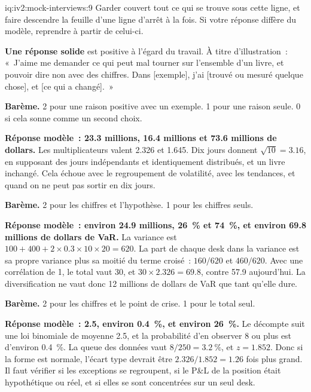 \begin{solution}{iq:iv2:mock-interviews:9}
Garder couvert tout ce qui se trouve sous cette ligne, et faire descendre la feuille d'une ligne d'arrêt à la fois. Si votre réponse diffère du modèle, reprendre à partir de celui-ci.

\ivstop
\textbf{Une réponse solide} est positive à l'égard du travail. À titre d'illustration~: «~J'aime me demander ce qui peut mal tourner sur l'ensemble d'un livre, et pouvoir dire non avec des chiffres. Dans [exemple], j'ai [trouvé ou mesuré quelque chose], et [ce qui a changé].~»

\textbf{Barème.} 2 pour une raison positive avec un exemple. 1 pour une raison seule. 0 si cela sonne comme un second choix.

\ivstop
\textbf{Réponse modèle~: 23.3 millions, 16.4 millions et 73.6 millions de dollars.} Les multiplicateurs valent 2.326 et 1.645. Dix jours donnent $\sqrt{10} = 3.16$, en supposant des jours indépendants et identiquement distribués, et un livre inchangé. Cela échoue avec le regroupement de volatilité, avec les tendances, et quand on ne peut pas sortir en dix jours.

\textbf{Barème.} 2 pour les chiffres et l'hypothèse. 1 pour les chiffres seuls.

\ivstop
\textbf{Réponse modèle~: environ 24.9 millions, 26~\% et 74~\%, et environ 69.8 millions de dollars de VaR.} La variance est $100 + 400 + 2 \times 0.3 \times 10 \times 20 = 620$. La part de chaque desk dans la variance est sa propre variance plus sa moitié du terme croisé~: $160/620$ et $460/620$. Avec une corrélation de 1, le total vaut 30, et $30 \times 2.326 = 69.8$, contre 57.9 aujourd'hui. La diversification ne vaut donc 12 millions de dollars de VaR que tant qu'elle dure.

\textbf{Barème.} 2 pour les chiffres et le point de crise. 1 pour le total seul.

\ivstop
\textbf{Réponse modèle~: 2.5, environ 0.4~\%, et environ 26~\%.} Le décompte suit une loi binomiale de moyenne 2.5, et la probabilité d'en observer 8 ou plus est d'environ 0.4~\%. La queue des données vaut $8/250 = 3.2~\%$, et $z = 1.852$. Donc si la forme est normale, l'écart type devrait être $2.326/1.852 = 1.26$ fois plus grand. Il faut vérifier si les exceptions se regroupent, si le P\&L de la position était hypothétique ou réel, et si elles se sont concentrées sur un seul desk.


\end{solution}
